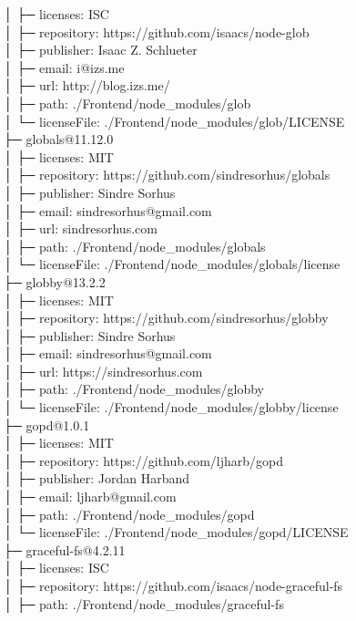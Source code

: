│  ├─ licenses: ISC\\
│  ├─ repository: https://github.com/isaacs/node-glob\\
│  ├─ publisher: Isaac Z. Schlueter\\
│  ├─ email: i@izs.me\\
│  ├─ url: http://blog.izs.me/\\
│  ├─ path: ./Frontend/node\_modules/glob\\
│  └─ licenseFile: ./Frontend/node\_modules/glob/LICENSE\\
├─ globals@11.12.0\\
│  ├─ licenses: MIT\\
│  ├─ repository: https://github.com/sindresorhus/globals\\
│  ├─ publisher: Sindre Sorhus\\
│  ├─ email: sindresorhus@gmail.com\\
│  ├─ url: sindresorhus.com\\
│  ├─ path: ./Frontend/node\_modules/globals\\
│  └─ licenseFile: ./Frontend/node\_modules/globals/license\\
├─ globby@13.2.2\\
│  ├─ licenses: MIT\\
│  ├─ repository: https://github.com/sindresorhus/globby\\
│  ├─ publisher: Sindre Sorhus\\
│  ├─ email: sindresorhus@gmail.com\\
│  ├─ url: https://sindresorhus.com\\
│  ├─ path: ./Frontend/node\_modules/globby\\
│  └─ licenseFile: ./Frontend/node\_modules/globby/license\\
├─ gopd@1.0.1\\
│  ├─ licenses: MIT\\
│  ├─ repository: https://github.com/ljharb/gopd\\
│  ├─ publisher: Jordan Harband\\
│  ├─ email: ljharb@gmail.com\\
│  ├─ path: ./Frontend/node\_modules/gopd\\
│  └─ licenseFile: ./Frontend/node\_modules/gopd/LICENSE\\
├─ graceful-fs@4.2.11\\
│  ├─ licenses: ISC\\
│  ├─ repository: https://github.com/isaacs/node-graceful-fs\\
│  ├─ path: ./Frontend/node\_modules/graceful-fs\\
